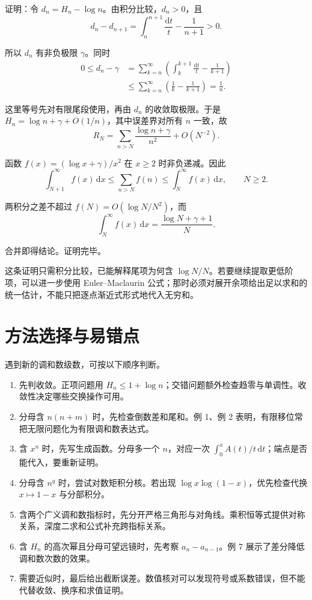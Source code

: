 \documentclass[11pt,a4paper]{article}
\providecommand{\tightlist}{\setlength{\itemsep}{3pt}\setlength{\parskip}{0pt}}
\newenvironment{proofblock}{\par\Needspace{4\baselineskip}\noindent}{\par}
\begin{document}
\begin{proofblock}

证明：令 \(d_n=H_n-\log n\)。由积分比较，\(d_n>0\)，且
\[
d_n-d_{n+1}
=\int_n^{n+1}\frac{\mathrm dt}{t}-\frac1{n+1}>0.
\]

所以 \(d_n\) 有非负极限 \(\gamma\)。同时
\[
\begin{aligned}
0\leqslant d_n-\gamma
&=\sum_{k=n}^{\infty}
\left(\int_k^{k+1}\frac{\mathrm dt}{t}-\frac1{k+1}\right)\\
&\leqslant\sum_{k=n}^{\infty}
\left(\frac1k-\frac1{k+1}\right)=\frac1n.
\end{aligned}
\]

这里等号先对有限尾段使用，再由 \(d_n\) 的收敛取极限。于是 \(H_n=\log n+\gamma+O(1/n)\)，其中误差界对所有 \(n\) 一致，故
\[
R_N=\sum_{n>N}\frac{\log n+\gamma}{n^2}+O(N^{-2}).
\]

函数 \(f(x)=(\log x+\gamma)/x^2\) 在 \(x\geqslant2\) 时非负递减。因此
\[
\int_{N+1}^\infty f(x)\,\mathrm dx
\leqslant\sum_{n>N}f(n)
\leqslant\int_N^\infty f(x)\,\mathrm dx,
\qquad N\geqslant2.
\]

两积分之差不超过 \(f(N)=O(\log N/N^2)\)，而
\[
\int_N^\infty f(x)\,\mathrm dx
=\frac{\log N+\gamma+1}{N}.
\]

合并即得结论。证明完毕。

\end{proofblock}

这条证明只需积分比较，已能解释尾项为何含 \(\log N/N\)。若要继续提取更低阶项，可以进一步使用 Euler--Maclaurin 公式；那时必须对展开余项给出足以求和的统一估计，不能只把逐点渐近式形式地代入无穷和。

\hypertarget{sec-10}{%
\section{方法选择与易错点}\label{sec-10}}

遇到新的调和数级数，可按以下顺序判断。

\begin{enumerate}
\def\labelenumi{\arabic{enumi}.}
\tightlist
\item
  先判收敛。正项问题用 \(H_n\leqslant1+\log n\)；交错问题额外检查趋零与单调性。收敛性决定哪些交换操作可用。
\item
  分母含 \(n(n+m)\) 时，先检查倒数差和尾和。例 1、例 2 表明，有限移位常把无限问题化为有限调和数表达式。
\item
  含 \(x^n\) 时，先写生成函数。分母多一个 \(n\)，对应一次 \(\int_0^x A(t)/t\,\mathrm dt\)；端点是否能代入，要重新证明。
\item
  分母含 \(n^q\) 时，尝试对数矩积分核。若出现 \(\log x\log(1-x)\)，优先检查代换 \(x\mapsto1-x\) 与分部积分。
\item
  含两个广义调和数指标时，先分开严格三角形与对角线。乘积恒等式提供对称关系，深度二求和公式补充跨指标关系。
\item
  含 \(H_n\) 的高次幂且分母可望远镜时，先考察 \(a_n-a_{n-1}\)。例 7 展示了差分降低调和数次数的效果。
\item
  需要近似时，最后给出截断误差。数值核对可以发现符号或系数错误，但不能代替收敛、换序和求值证明。
\end{enumerate}
\end{document}
